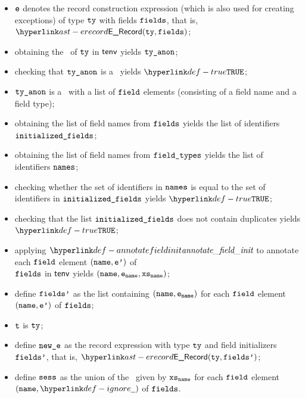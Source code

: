 \ProseParagraph
\AllApply
\begin{itemize}
  \item $\texttt{e}$ denotes the record construction expression (which is also used for creating exceptions) of type $\texttt{ty}$ with fields $\texttt{fields}$,
        that is, $\ERecord(\tty, \vfields)$;
  \item obtaining the \underlyingtype\ of $\texttt{ty}$ in $\textsf{tenv}$ yields $\texttt{ty\_anon}$\ProseOrTypeError;
  \item checking that $\texttt{ty\_anon}$ is a \structuredtype\ yields $\True$\ProseTerminateAs{\UnexpectedType};
  \item $\texttt{ty\_anon}$ is a \structuredtype\ with a list of $\texttt{field}$ elements (consisting of a field name and a field type);
  \item obtaining the list of field names from $\texttt{fields}$ yields the list of identifiers \\
        $\texttt{initialized\_fields}$;
  \item obtaining the list of field names from $\texttt{field\_types}$ yields the list of identifiers $\texttt{names}$;
  \item checking whether the set of identifiers in $\texttt{names}$ is equal to the set of identifiers in $\texttt{initialized\_fields}$
        yields $\True$\ProseOrTypeError;
  \item checking that the list $\texttt{initialized\_fields}$ does not contain duplicates yields \\
        $\True$\ProseOrTypeError;
  \item applying $\annotatefieldinit$ to annotate each $\texttt{field}$ element $(\texttt{name},\texttt{e'})$ of \\
        $\texttt{fields}$ in $\textsf{tenv}$ yields $(\texttt{name},\texttt{e}_{\texttt{name}},\texttt{xs}_{\texttt{name}})$\ProseOrTypeError;
  \item define $\texttt{fields'}$ as the list containing $(\texttt{name},\texttt{e}_{\texttt{name}})$ for each $\texttt{field}$ element $(\texttt{name},\texttt{e'})$ of $\texttt{fields}$;
  \item $\texttt{t}$ is $\texttt{ty}$;
  \item define $\texttt{new\_e}$ as the record expression with type $\texttt{ty}$ and field initializers $\texttt{fields'}$, that is, $\ERecord(\tty, \fieldsp)$;
  \item define $\texttt{sess}$ as the union of the \sideeffectdescriptorsetsterm\ given by $\texttt{xs}_{\texttt{name}}$ for each $\texttt{field}$ element $(\name,\Ignore)$ of $\texttt{fields}$.
\end{itemize}
\FormallyParagraph
